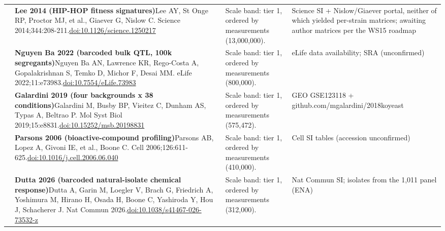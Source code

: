 \begin{landscape}
\begin{longtable}{@{}r@{\hspace{4pt}} L{86mm} L{92mm} L{62mm}@{}}
 & \textbf{Lee 2014 (HIP-HOP fitness signatures)}\newline Lee AY, St Onge RP, Proctor MJ, et al., Giaever G, Nislow C. Science 2014;344:208-211.\newline \href{https://doi.org/10.1126/science.1250217}{doi:10.1126/\allowbreak science.1250217} & Scale band: tier 1, ordered by measurements (13,000,000). & Science SI + Nislow/\allowbreak Giaever portal, neither of which yielded per-strain matrices; awaiting author matrices per the WS15 roadmap \\
 & \textbf{Nguyen Ba 2022 (barcoded bulk QTL, 100k segregants)}\newline Nguyen Ba AN, Lawrence KR, Rego-Costa A, Gopalakrishnan S, Temko D, Michor F, Desai MM. eLife 2022;11:e73983.\newline \href{https://doi.org/10.7554/eLife.73983}{doi:10.7554/\allowbreak eLife.73983} & Scale band: tier 1, ordered by measurements (800,000). & eLife data availability; SRA (unconfirmed) \\
 & \textbf{Galardini 2019 (four backgrounds x 38 conditions)}\newline Galardini M, Busby BP, Vieitez C, Dunham AS, Typas A, Beltrao P. Mol Syst Biol 2019;15:e8831.\newline \href{https://doi.org/10.15252/msb.20198831}{doi:10.15252/\allowbreak msb.20198831} & Scale band: tier 1, ordered by measurements (575,472). & GEO GSE123118 + github.com/\allowbreak mgalardini/\allowbreak 2018koyeast \\
 & \textbf{Parsons 2006 (bioactive-compound profiling)}\newline Parsons AB, Lopez A, Givoni IE, et al., Boone C. Cell 2006;126:611-625.\newline \href{https://doi.org/10.1016/j.cell.2006.06.040}{doi:10.1016/\allowbreak j.cell.2006.06.040} & Scale band: tier 1, ordered by measurements (410,000). & Cell SI tables (accession unconfirmed) \\
 & \textbf{Dutta 2026 (barcoded natural-isolate chemical response)}\newline Dutta A, Garin M, Loegler V, Brach G, Friedrich A, Yoshimura M, Hirano H, Osada H, Boone C, Yashiroda Y, Hou J, Schacherer J. Nat Commun 2026.\newline \href{https://doi.org/10.1038/s41467-026-73532-z}{doi:10.1038/\allowbreak s41467-026-73532-z} & Scale band: tier 1, ordered by measurements (312,000). & Nat Commun SI; isolates from the 1,011 panel (ENA) \\

\end{longtable}
\end{landscape}
